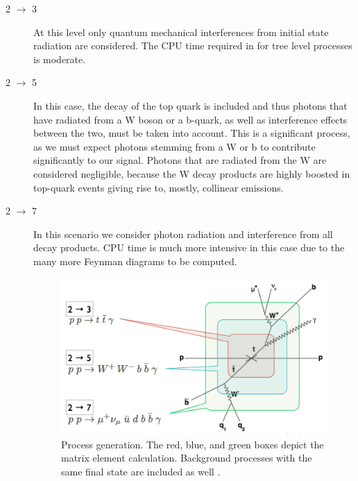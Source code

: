 \begin{description}
\item[2 $\to$ 3] At this level only quantum mechanical interferences from initial state radiation are considered. The CPU time required in for tree level processes is moderate.

\item[2 $\to$ 5] In this case, the decay of the top quark is included and thus photons that have radiated from a W boson or a b-quark, as well as interference effects between the two, must be taken into account. This is a significant process, as we must expect photons stemming from a W or b to contribute significantly to our signal. Photons that are radiated from the W are considered negligible, because the W decay products are highly boosted in top-quark events giving rise to, mostly, collinear emissions. 

\item[2 $\to$ 7] In this scenario we consider photon radiation and interference from all decay products. CPU time is much more intensive in this case due to the many more Feynman diagrams to be computed.                                                                            

\begin{figure} 
\begin{center}
\includegraphics[width=\textwidth]{Figures/MatrixElementCalculation.png}
\end{center}
\caption{Process generation. The red, blue, and green boxes depict the matrix element calculation. Background processes with the same final state are included as well \cite{heinerthesis}.}
\label{fig-MatrixElementCalculation}
\end{figure}
                               

\end{description}

